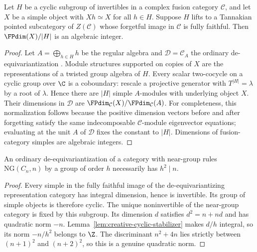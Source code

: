 \begin{lemma}
\label{lem:creative-cyclic-stabilizer}
Let $H$ be a cyclic subgroup of invertibles in a complex fusion category
$\mathcal C$, and let $X$ be a simple object with $Xh\simeq X$ for all
$h\in H$. Suppose $H$ lifts to a Tannakian pointed subcategory of
$Z(\mathcal C)$ whose forgetful image in $\mathcal C$ is fully faithful.
Then $\FPdim(X)/|H|$ is an algebraic integer.
\end{lemma}
\begin{proof}
Let $A=\bigoplus_{h\in H}h$ be the regular algebra and
$\mathcal D=\mathcal C_A$ the ordinary de-equivariantization
\cite[Theorem~8.23.3]{EGNO}. Module structures supported on copies
of $X$ are the representations of a twisted group algebra of $H$.
Every scalar two-cocycle on a cyclic group over $\C$ is a coboundary:
rescale a projective generator with $T^{|H|}=\lambda$ by a root of
$\lambda$. Hence there are $|H|$ simple $A$-modules with underlying
object $X$. Their dimensions in $\mathcal D$ are
$\FPdim_{\mathcal C}(X)/\FPdim_{\mathcal C}(A)$.
For completeness, this normalization follows because the positive
dimension vectors before and after forgetting satisfy the same
indecomposable $\mathcal C$-module eigenvector equations; evaluating
at the unit $A$ of $\mathcal D$ fixes the constant to $|H|$.
Dimensions of fusion-category simples are algebraic integers.
\end{proof}

\begin{corollary}
\label{cor:creative-ng-square}
An ordinary de-equivariantization of a category with near-group rules
$\mathrm{NG}(C_n,n)$ by a group of order $h$ necessarily has $h^2\mid n$.
\end{corollary}
\begin{proof}
Every simple in the fully faithful image of the de-equivariantizing
representation category has integral dimension, hence is invertible.
Its group of simple objects is therefore cyclic. The unique
noninvertible of the near-group category is fixed by this subgroup.
Its dimension $d$ satisfies $d^2=n+nd$ and has quadratic norm $-n$.
Lemma~\ref{lem:creative-cyclic-stabilizer} makes $d/h$ integral, so its
norm $-n/h^2$ belongs to $\Z$. The discriminant $n^2+4n$ lies strictly
between $(n+1)^2$ and $(n+2)^2$, so this is a genuine quadratic norm.
\end{proof}

